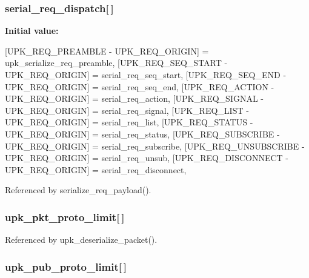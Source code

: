 \subsubsection[{serial\_\-req\_\-dispatch}]{ {\bf serial\_\-req\_\-dispatch}[$\,$]\hspace{0.3cm}{\ttfamily  [static]}}\label{upk__v0__protocol__serializer_8c_a033ee00f99796af241b31067b169e33f}
{\bfseries Initial value:}
\begin{DoxyCode}
 {
    [UPK_REQ_PREAMBLE - UPK_REQ_ORIGIN] = upk_serialize_req_preamble,
    [UPK_REQ_SEQ_START - UPK_REQ_ORIGIN] = serial_req_seq_start,
    [UPK_REQ_SEQ_END - UPK_REQ_ORIGIN] = serial_req_seq_end,
    [UPK_REQ_ACTION - UPK_REQ_ORIGIN] = serial_req_action,
    [UPK_REQ_SIGNAL - UPK_REQ_ORIGIN] = serial_req_signal,
    [UPK_REQ_LIST - UPK_REQ_ORIGIN] = serial_req_list,
    [UPK_REQ_STATUS - UPK_REQ_ORIGIN] = serial_req_status,
    [UPK_REQ_SUBSCRIBE - UPK_REQ_ORIGIN] = serial_req_subscribe,
    [UPK_REQ_UNSUBSCRIBE - UPK_REQ_ORIGIN] = serial_req_unsub,
    [UPK_REQ_DISCONNECT - UPK_REQ_ORIGIN] = serial_req_disconnect,
}
\end{DoxyCode}


Referenced by serialize\_\-req\_\-payload().

\subsubsection[{upk\_\-pkt\_\-proto\_\-limit}]{ {\bf upk\_\-pkt\_\-proto\_\-limit}[$\,$]}\label{upk__v0__protocol__serializer_8c_ae68958999ec86cc64f3a4890000e55ac}


Referenced by upk\_\-deserialize\_\-packet().

\subsubsection[{upk\_\-pub\_\-proto\_\-limit}]{ {\bf upk\_\-pub\_\-proto\_\-limit}[$\,$]}\label{upk__v0__protocol__serializer_8c_a14dea902b70e94c33ef604fa46f155fc}
